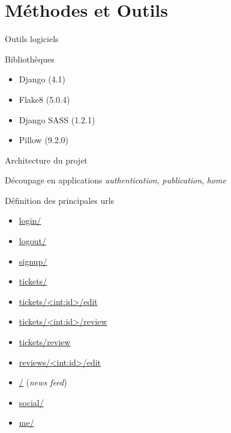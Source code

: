 \section{Méthodes et Outils}

\begin{frame}{Outils logiciels}
  \begin{block}{Bibliothèques}
    \begin{itemize}
    \item Django (4.1)
    \item Flake8 (5.0.4)
    \item Django SASS (1.2.1)
    \item Pillow (9.2.0)
    \end{itemize}
  \end{block}
\end{frame}

\begin{frame}{Architecture du projet}
  \begin{block}{Découpage en applications}
    {\color{darkred}\textit{authentication}}, 
    {\color{darkblue}\textit{publication}}, 
    {\color{darkgreen}\textit{home}}
  \end{block}
  
  \begin{block}{Définition des principales urls}
    \tiny
    \begin{itemize}
    \item {\color{darkred} \url{login/}}
    \item {\color{darkred} \url{logout/}}
    \item {\color{darkred} \url{signup/}}
    \item {\color{darkblue} \url{tickets/}}
    \item {\color{darkblue} \url{tickets/<int:id>/edit}}
    \item {\color{darkblue} \url{tickets/<int:id>/review}}
    \item {\color{darkblue} \url{tickets/review}}
    \item {\color{darkblue} \url{reviews/<int:id>/edit}}

    \item {\color{darkgreen} \url{/}} (\textit{news feed})
    \item {\color{darkgreen} \url{social/}}
    \item {\color{darkgreen} \url{me/}}
    \end{itemize}
  \end{block}
\end{frame}


